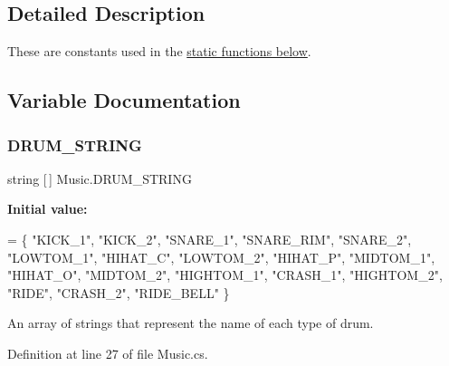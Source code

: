 \subsection{Detailed Description}
These are constants used in the \hyperlink{group___music_stat_func}{static functions below}. 

\subsection{Variable Documentation}
\mbox{\label{group___music_constants_ga1381281d147886a2cf3584ab0c7a67d6}} 
\subsubsection{\texorpdfstring{D\+R\+U\+M\+\_\+\+S\+T\+R\+I\+NG}{DRUM\_STRING}}
{\footnotesize\ttfamily string \mbox{[}$\,$\mbox{]} Music.\+D\+R\+U\+M\+\_\+\+S\+T\+R\+I\+NG\hspace{0.3cm}{\ttfamily [static]}}

{\bfseries Initial value\+:}
\begin{DoxyCode}
=
        \{ \textcolor{stringliteral}{"KICK\_1"}, \textcolor{stringliteral}{"KICK\_2"}, \textcolor{stringliteral}{"SNARE\_1"}, \textcolor{stringliteral}{"SNARE\_RIM"}, \textcolor{stringliteral}{"SNARE\_2"}, \textcolor{stringliteral}{"LOWTOM\_1"},
        \textcolor{stringliteral}{"HIHAT\_C"}, \textcolor{stringliteral}{"LOWTOM\_2"}, \textcolor{stringliteral}{"HIHAT\_P"}, \textcolor{stringliteral}{"MIDTOM\_1"}, \textcolor{stringliteral}{"HIHAT\_O"}, \textcolor{stringliteral}{"MIDTOM\_2"},
        \textcolor{stringliteral}{"HIGHTOM\_1"}, \textcolor{stringliteral}{"CRASH\_1"}, \textcolor{stringliteral}{"HIGHTOM\_2"}, \textcolor{stringliteral}{"RIDE"}, \textcolor{stringliteral}{"CRASH\_2"}, \textcolor{stringliteral}{"RIDE\_BELL"} \}
\end{DoxyCode}


An array of strings that represent the name of each type of drum. 



Definition at line 27 of file Music.\+cs.

\mbox{\label{group___music_constants_gabce1a1ac5b9b6355af6bd7fb3868467a}} 
